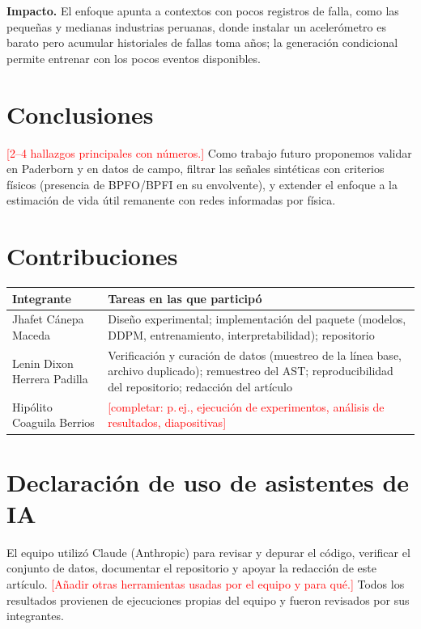 \documentclass[conference]{IEEEtran}
\newcommand{\pend}[1]{\textcolor{red}{[#1]}}
\begin{document}
\textbf{Impacto.} El enfoque apunta a contextos con pocos registros de falla, como las pequeñas y medianas industrias peruanas, donde instalar un acelerómetro es barato pero acumular historiales de fallas toma años; la generación condicional permite entrenar con los pocos eventos disponibles.

\section{Conclusiones}
\pend{2--4 hallazgos principales con números.} Como trabajo futuro proponemos validar en Paderborn y en datos de campo, filtrar las señales sintéticas con criterios físicos (presencia de BPFO/BPFI en su envolvente), y extender el enfoque a la estimación de vida útil remanente con redes informadas por física.

\section*{Contribuciones}
\begin{center}
\footnotesize
\begin{tabular}{p{}p{}}
\toprule
Integrante & Tareas en las que participó \\ \midrule
Jhafet Cánepa Maceda & Diseño experimental; implementación del paquete (modelos, DDPM, entrenamiento, interpretabilidad); repositorio \\
Lenin Dixon Herrera Padilla & Verificación y curación de datos (muestreo de la línea base, archivo duplicado); remuestreo del AST; reproducibilidad del repositorio; redacción del artículo \\
Hipólito Coaguila Berrios & \pend{completar: p.\,ej., ejecución de experimentos, análisis de resultados, diapositivas} \\
\bottomrule
\end{tabular}
\end{center}

\section*{Declaración de uso de asistentes de IA}
El equipo utilizó Claude (Anthropic) para revisar y depurar el código, verificar el conjunto de datos, documentar el repositorio y apoyar la redacción de este artículo. \pend{Añadir otras herramientas usadas por el equipo y para qué.} Todos los resultados provienen de ejecuciones propias del equipo y fueron revisados por sus integrantes.



\end{document}
